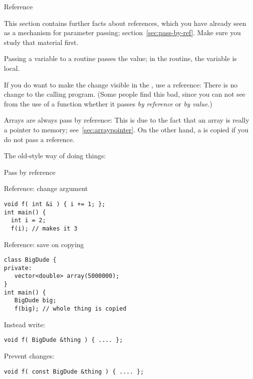 
 {Reference}
\label{sec:reference}

This section contains further facts about references, which you have
already seen as a mechanism for parameter passing;
section~\ref{sec:pass-by-ref}.
Make sure you study that material first.

Passing a variable to a routine passes the value; in the routine, the
variable is local.


If you do want to make the change visible in the
%
, use a reference:
%
%
There is no change to the calling program. (Some people find this bad,
since you can not see from the use of a function whether it passes
%
\emph{by reference}
%
or \emph{by value}.)

Arrays are always pass by reference:
%
%
This is due to the fact that an array is really a pointer to memory;
see~\ref{sec:arraypointer}. On the other hand, a  is
copied if you do not pass a reference.

The old-style way of doing things:
%

 {Pass by reference}

\begin{block}{Reference: change argument}
\label{sl:refarg-change}
\begin{verbatim}
void f( int &i ) { i += 1; };
int main() {
  int i = 2;
  f(i); // makes it 3
\end{verbatim}
\end{block}

\begin{block}{Reference: save on copying}
\label{sl:refarg-nocopy}
\begin{verbatim}
class BigDude {
private:
   vector<double> array(5000000);
}
int main() {
   BigDude big;
   f(big); // whole thing is copied
\end{verbatim}
Instead write:
\begin{verbatim}
void f( BigDude &thing ) { .... };
\end{verbatim}
Prevent changes:
\begin{verbatim}
void f( const BigDude &thing ) { .... };
\end{verbatim}
\end{block}

